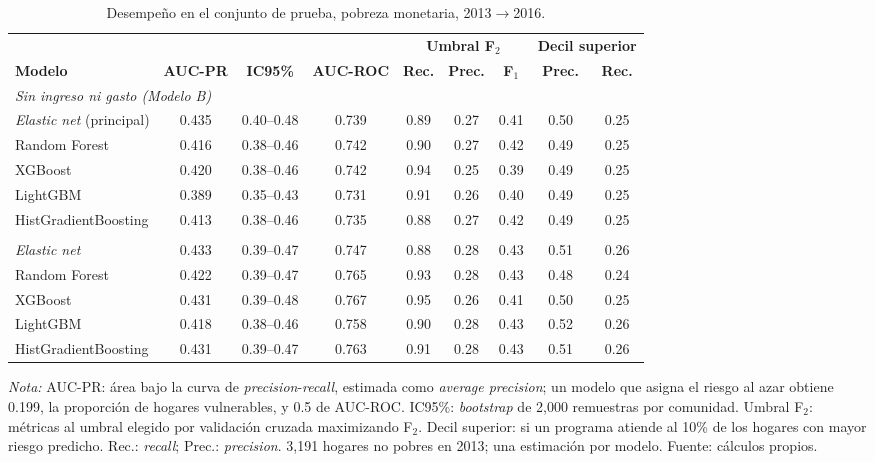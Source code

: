 \begin{table}[tbp]
  \centering
  \caption{Desempeño en el conjunto de prueba, pobreza monetaria, 2013$\to$2016.}
  \label{tab:desempeno_pr}
  \footnotesize
  \setlength{\tabcolsep}{4pt}
  \begin{tabular}{l ccc ccc cc}
    \toprule
    & & & & \multicolumn{3}{c}{\textbf{Umbral F$_2$}} & \multicolumn{2}{c}{\textbf{Decil superior}} \\
    \cmidrule(lr){5-7}\cmidrule(lr){8-9}
    \textbf{Modelo} & \textbf{AUC-PR} & \textbf{IC95\%} & \textbf{AUC-ROC} & \textbf{Rec.} & \textbf{Prec.} & \textbf{F$_1$} & \textbf{Prec.} & \textbf{Rec.} \\
    \midrule
    \multicolumn{9}{l}{\textit{Sin ingreso ni gasto (Modelo B)}} \\
    \quad \emph{Elastic net} (principal) & 0.435 & 0.40--0.48 & 0.739 & 0.89 & 0.27 & 0.41 & 0.50 & 0.25 \\
    \quad Random Forest & 0.416 & 0.38--0.46 & 0.742 & 0.90 & 0.27 & 0.42 & 0.49 & 0.25 \\
    \quad XGBoost & 0.420 & 0.38--0.46 & 0.742 & 0.94 & 0.25 & 0.39 & 0.49 & 0.25 \\
    \quad LightGBM & 0.389 & 0.35--0.43 & 0.731 & 0.91 & 0.26 & 0.40 & 0.49 & 0.25 \\
    \quad HistGradientBoosting & 0.413 & 0.38--0.46 & 0.735 & 0.88 & 0.27 & 0.42 & 0.49 & 0.25 \\
    \addlinespace
    \multicolumn{9}{l}{\textit{Con ingreso y gasto (Modelo A)}} \\
    \quad \emph{Elastic net} & 0.433 & 0.39--0.47 & 0.747 & 0.88 & 0.28 & 0.43 & 0.51 & 0.26 \\
    \quad Random Forest & 0.422 & 0.39--0.47 & 0.765 & 0.93 & 0.28 & 0.43 & 0.48 & 0.24 \\
    \quad XGBoost & 0.431 & 0.39--0.48 & 0.767 & 0.95 & 0.26 & 0.41 & 0.50 & 0.25 \\
    \quad LightGBM & 0.418 & 0.38--0.46 & 0.758 & 0.90 & 0.28 & 0.43 & 0.52 & 0.26 \\
    \quad HistGradientBoosting & 0.431 & 0.39--0.47 & 0.763 & 0.91 & 0.28 & 0.43 & 0.51 & 0.26 \\
    \bottomrule
  \end{tabular}
  \begin{minipage}{0.95\textwidth}
    \vspace{4pt}
    \footnotesize \textit{Nota:} AUC-PR: área bajo la curva de
    \emph{precision}-\emph{recall}, estimada como \emph{average precision};
    un modelo que asigna el riesgo al azar obtiene 0.199, la
    proporción de hogares vulnerables, y 0.5 de AUC-ROC. IC95\%:
    \emph{bootstrap} de 2{,}000 remuestras por comunidad. Umbral F$_2$:
    métricas al umbral elegido por validación cruzada maximizando F$_2$.
    Decil superior: si un programa atiende al 10\% de los hogares con
    mayor riesgo predicho. Rec.: \emph{recall}; Prec.: \emph{precision}.
    3{,}191 hogares no pobres en 2013; una estimación por modelo.
    Fuente: cálculos propios.
  \end{minipage}
\end{table}